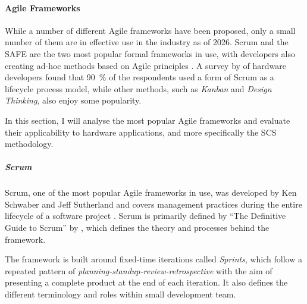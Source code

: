 \documentclass[a4paper,nobib,justified,final]{tufte-book}
\begin{document}
\paragraph{Agile Frameworks}
\label{par:LITERATURE_agile_frameworks}

While a number of different Agile frameworks have been proposed, only a small number of them are in effective use in the industry as of 2026.
Scrum and the \acf{SAFE} are the two most popular formal frameworks in use, with developers also creating ad-hoc methods based on Agile principles \autocite{digital.aiStateAgileReport2025}.
A \citeyear{atzbergerAgileDevelopmentPhysical2020} survey by \citeauthor{atzbergerAgileDevelopmentPhysical2020} \autocite{atzbergerAgileDevelopmentPhysical2020} of hardware developers found that \qty{90}{\percent} of the respondents used a form of Scrum as a lifecycle process model, while other methods, such as \emph{Kanban} and \emph{Design Thinking}, also enjoy some popularity.

In this section, I will analyse the most popular Agile frameworks and evaluate their applicability to hardware applications, and more specifically the \ac{SCS} methodology.

\subparagraph{Scrum}
\label{sec:LITERATURE_scrum}
Scrum, one of the most popular Agile frameworks in use, was developed by Ken Schwaber and Jeff Sutherland and covers management practices during the entire lifecycle of a software project \autocite{boehmBalancingAgilityDiscipline2004}.
Scrum is primarily defined by ``The Definitive Guide to Scrum'' by \citeauthor{schwaverDefinitiveGuideScrum2020} \autocite{schwaverDefinitiveGuideScrum2020}, which defines the theory and processes behind the framework.

The framework is built around fixed-time iterations called \emph{Sprints}, which follow a repeated pattern of \emph{planning-\-standup-\-review-\-retrospective} with the aim of presenting a complete product at the end of each iteration. It also defines the different terminology and roles within small development team.
\end{document}
